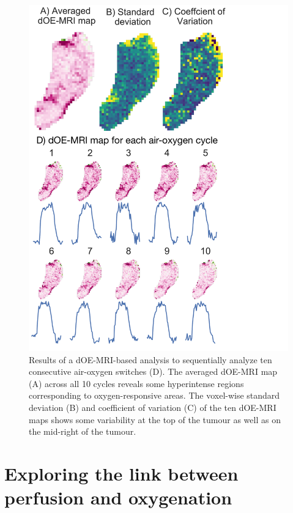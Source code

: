 \begin{figure}[htbp]  
   \centering
   \includegraphics[width=\textwidth]{futurework/futurework-images/cyclingHypoxia.pdf} %
   \caption{Results of a \acs{dOE-MRI}-based analysis to sequentially analyze ten consecutive air-oxygen switches (D). The averaged \acs{dOE-MRI} map (A) across all 10 cycles reveals some hyperintense regions corresponding to oxygen-responsive areas. The voxel-wise standard deviation (B) and coefficient of variation (C) of the ten \acs{dOE-MRI} maps shows some variability at the top of the tumour as well as on the mid-right of the tumour.}
   \label{longcycles}
\end{figure}

\section{Exploring the link between perfusion and oxygenation}

